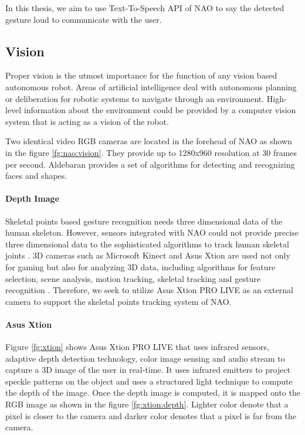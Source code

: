 

In this thesis, we aim to use Text-To-Speech API of NAO to say the detected gesture loud to communicate with the user.

\subsection{Vision} \label{sec:nao:vision} Proper vision is the utmost importance for the function of any vision based autonomous robot. Areas of artificial intelligence deal with autonomous planning or deliberation for robotic systems to navigate through an environment. High-level information about the environment could be provided by a computer vision system that is acting as a vision of the robot.



Two identical video RGB cameras are located in the forehead of NAO as shown in the figure \ref{fg:nao:vision}. They provide up to 1280x960 resolution at 30 frames per second. Aldebaran provides a set of algorithms for detecting and recognizing faces and shapes.

\paragraph*{Depth Image} Skeletal points based gesture recognition needs three dimensional data of the human skeleton. However, sensors integrated with NAO could not provide precise three dimensional data to the sophisticated algorithms to track human skeletal joints \cite{17}. 3D cameras such as Microsoft Kinect and Asus Xtion are used not only for gaming but also for analyzing 3D data, including algorithms for feature selection, scene analysis, motion tracking, skeletal tracking and gesture recognition \cite{9} \cite{18}. Therefore, we seek to utilize Asus Xtion PRO LIVE as an external camera to support the skeletal points tracking system of NAO. 



\paragraph*{Asus Xtion} Figure \ref{fg:xtion} shows Asus Xtion PRO LIVE that uses infrared sensors, adaptive depth detection technology, color image sensing and audio stream to capture a 3D image of the user in real-time. It uses infrared emitters to project speckle patterns on the object and uses a structured light technique to compute the depth of the image. Once the depth image is computed, it is mapped onto the RGB image as shown in the figure \ref{fg:xtion:depth}. Lighter color denote that a pixel is closer to the camera and darker color denotes that a pixel is far from the camera.

